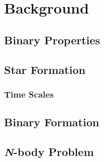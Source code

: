 \section{Background}

{ \lipsum[14] }

\subsection{Binary Properties}

{ \lipsum[1-2] }

\subsection{Star Formation}

{ \lipsum[8-9] }

\subsubsection{Time Scales}

{ \lipsum[15-16] }

\subsection{Binary Formation}

{ \lipsum[6-7] }

\subsection{{\slshape N}-body Problem}

{ \lipsum[1] }